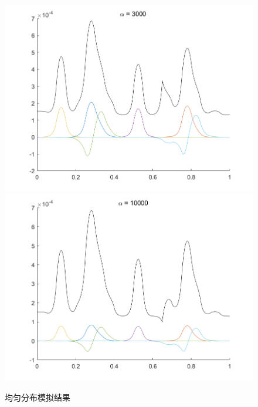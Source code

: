 \documentclass[12pt,a4paper]{article}
\begin{document}
\begin{figure}[htbp]
\includegraphics[width=0.3\linewidth]{parameter/W1X7A3000}
\includegraphics[width=0.3\linewidth]{parameter/W1X7A10000}
\caption{均匀分布模拟结果}
\label{A1}
\end{figure}
\end{document}
